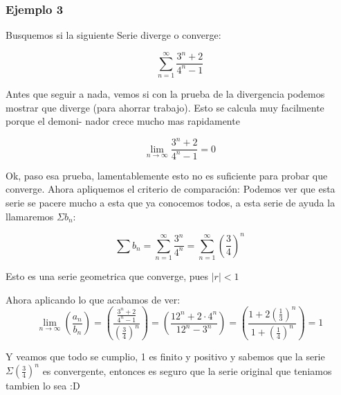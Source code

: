 \documentclass[12pt]{report}                                %
\begin{document}
        \subsubsection{Ejemplo 3}
            Busquemos si la siguiente Serie diverge o converge:

            \begin{equation*}
                \sum_{n=1}^{\infty} \frac{3^n+2}{4^n-1}
            \end{equation*}

            Antes que seguir a nada, vemos si con la prueba de la divergencia podemos mostrar que diverge (para ahorrar trabajo). Esto se calcula muy facilmente porque el demoni- nador crece mucho mas rapidamente

            \begin{equation*}
                \lim_{n \to \infty}  \frac{3^n+2}{4^n-1} = 0
            \end{equation*}


            Ok, paso esa prueba, lamentablemente esto no es
            suficiente para probar que converge.
            Ahora apliquemos el criterio de comparación: Podemos ver que esta serie se pacere mucho a esta que ya conocemos todos, a esta serie de ayuda la llamaremos $\Sigma b_n$:

            \begin{equation*}
                \sum b_n = \sum_{n=1}^{\infty} \frac{3^n}{4^n} = \sum_{n=1}^{\infty} \left( \frac{3}{4} \right)^n 
            \end{equation*}

            Esto es una serie geometrica que converge, pues $|r| < 1$

            Ahora aplicando lo que acabamos de ver:
            \begin{equation*}
                \lim_{n \to \infty} \left( \frac{a_n}{b_n} \right) = \left( \frac{ \frac{3^n+2}{4^n-1} }{ \left( \frac{3}{4} \right)^n  } \right) =  \left( \frac{12^n + 2 \cdot 4^n}{12^n -3^n} \right) = \left( \frac{1 + 2 (\frac{1}{3})^n}{1 +  (\frac{1}{4})^n} \right) = 1
            \end{equation*}

            Y veamos que todo se cumplio, 1 es finito y positivo y sabemos que la serie $\Sigma (\frac{3}{4})^n$ es convergente, entonces es seguro que la serie original que teniamos tambien lo sea :D
\end{document}
